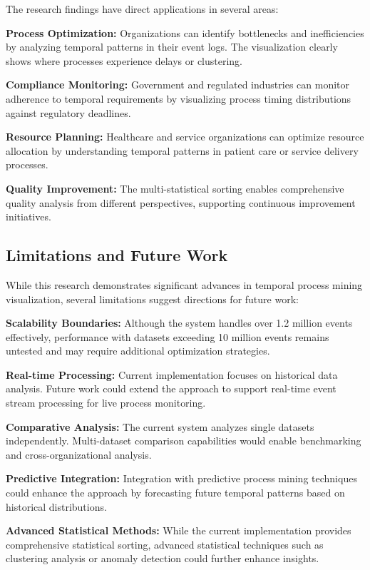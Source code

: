 \documentclass[11pt,a4paper]{article}
\begin{document}
The research findings have direct applications in several areas:

\textbf{Process Optimization:} Organizations can identify bottlenecks and inefficiencies by analyzing temporal patterns in their event logs. The visualization clearly shows where processes experience delays or clustering.

\textbf{Compliance Monitoring:} Government and regulated industries can monitor adherence to temporal requirements by visualizing process timing distributions against regulatory deadlines.

\textbf{Resource Planning:} Healthcare and service organizations can optimize resource allocation by understanding temporal patterns in patient care or service delivery processes.

\textbf{Quality Improvement:} The multi-statistical sorting enables comprehensive quality analysis from different perspectives, supporting continuous improvement initiatives.

\subsection{Limitations and Future Work}

While this research demonstrates significant advances in temporal process mining visualization, several limitations suggest directions for future work:

\textbf{Scalability Boundaries:} Although the system handles over 1.2 million events effectively, performance with datasets exceeding 10 million events remains untested and may require additional optimization strategies.

\textbf{Real-time Processing:} Current implementation focuses on historical data analysis. Future work could extend the approach to support real-time event stream processing for live process monitoring.

\textbf{Comparative Analysis:} The current system analyzes single datasets independently. Multi-dataset comparison capabilities would enable benchmarking and cross-organizational analysis.

\textbf{Predictive Integration:} Integration with predictive process mining techniques could enhance the approach by forecasting future temporal patterns based on historical distributions.

\textbf{Advanced Statistical Methods:} While the current implementation provides comprehensive statistical sorting, advanced statistical techniques such as clustering analysis or anomaly detection could further enhance insights.
\end{document}
